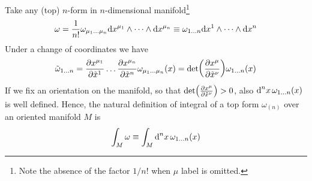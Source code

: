 \documentclass[../main/main.tex]{subfiles}
\begin{document}
Take any (top) $n$-form in $n$-dimensional manifold\footnote{Note the absence of the factor $1/n!$ when $\mu$ label is omitted.}
\[\omega=\frac1{n!}\omega_{\mu_1\dots\mu_n}\textup{d} x^{\mu_1}\wedge\dots\wedge\textup{d} x^{\mu_n}
\equiv\omega_{1\dots n}\textup{d} x^{1}\wedge\dots\wedge\textup{d} x^{n}\]
Under a change of coordinates we have
\[\tilde\omega_{1\dots n}=\frac{\partial x^{\mu_1}}{\partial \tilde x^1}\dots\frac{\partial x^{\mu_n}}{\partial \tilde x^n}\omega_{\mu_1\dots\mu_n}(x)=\det(\frac{\partial x^\mu}{\partial \tilde x^\nu})\omega_{1\dots n}(x)\]
If we fix an orientation on the manifold, so that $\det(\frac{\partial x^\mu}{\partial \tilde x^\nu})>0$, also $\textup{d}^{n}{x}\,\omega_{1\dots n}(x)$ is well defined. Hence, the natural definition of integral of a top form $\omega_{(n)}$ over an oriented manifold $M$ is 
\[\int_M\omega\equiv\int_M\textup{d}^{n}{x}\,\omega_{1\dots n}(x)\]
\end{document}
